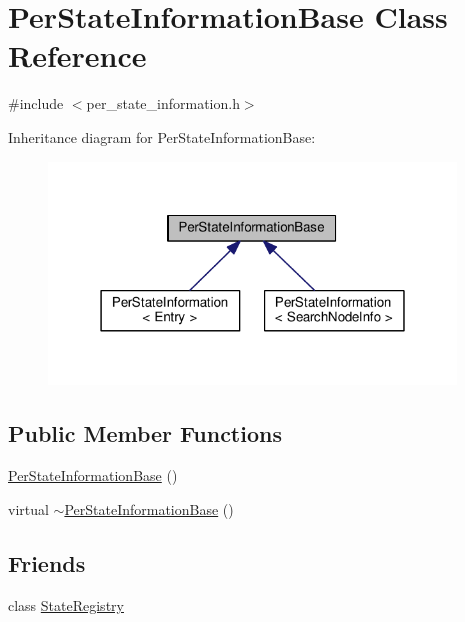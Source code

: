 \hypertarget{classPerStateInformationBase}{\section{Per\-State\-Information\-Base Class Reference}
\label{classPerStateInformationBase}
}


{\ttfamily \#include $<$per\-\_\-state\-\_\-information.\-h$>$}



Inheritance diagram for Per\-State\-Information\-Base\-:
\nopagebreak
\begin{figure}[H]
\begin{center}
\leavevmode
\includegraphics[width=307pt]{classPerStateInformationBase__inherit__graph}
\end{center}
\end{figure}
\subsection*{Public Member Functions}
\begin{DoxyCompactItemize}
\item 
\hyperlink{classPerStateInformationBase_a7407dca24f0f0d61d8cea027e1ba31f2}{Per\-State\-Information\-Base} ()
\item 
virtual \hyperlink{classPerStateInformationBase_a7000d5856b1096b567c851f611824ccb}{$\sim$\-Per\-State\-Information\-Base} ()
\end{DoxyCompactItemize}
\subsection*{Friends}
\begin{DoxyCompactItemize}
\item 
class \hyperlink{classPerStateInformationBase_ab5efff6db8e98ec0a35ba239b664d5f8}{State\-Registry}
\end{DoxyCompactItemize}


